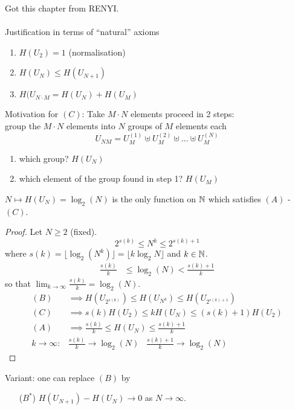 \documentclass[mfit.tex]{subfiles}
\begin{document}
Got this chapter from RENYI.\\
\\
Justification in terms of \enquote{natural} axioms
\begin{enumerate}[label=(\Alph*)]
  \item $H(U_2) = 1$ (normalisation)
  \item $H(U_N) \leq H(U_{N+1})$
  \item $H(U_{N\cdot M} = H(U_N) + H(U_M) $
\end{enumerate}

Motivation for $(C)$: Take $M \cdot N$ elements proceed in 2 steps:\\
group the $M \cdot N$ elements into $N$ groups of $M$ elements each
\[ U_{NM} = U_M^{(1)} \uplus U_M^{(2)} \uplus \dots \uplus U_M^{(N)} \]
\begin{enumerate}
  \item which group? $H(U_N)$
  \item which element of the group found in step 1? $H(U_M)$
\end{enumerate}

\begin{lemma}
  $N \mapsto H(U_N) = \log_2(N)$ is the only function on $\mathbb{N}$ which satisfies $(A)$ - $(C)$.
\end{lemma}

\begin{proof}
  Let $N \geq 2$ (fixed).
  \[ 2^{s(k)} \leq N^k \leq 2^{s(k) +1} \]
  where $s(k) =  \lfloor \log_2 (N^k) \rfloor = \lfloor k \log_2 N \rfloor$ and $k \in \mathbb{N}$.
  \begin{align*}
    \frac{s(k)}{k} &\leq \log_2 (N) < \frac{s(k)+1}{k}
  \end{align*}
  so that $\lim_{k\to \infty} \frac{s(k)}{k} = \log_2 (N)$.
  \begin{align*}
    (B) &\implies H(U_{2^{s(k)}}) \leq H(U_{N^k}) \leq H(U_{2^{s(k)+1}}) \\
    (C) &\implies s(k) H(U_2) \leq k H(U_N) \leq (s(k)+1)H(U_2) \\
    (A) &\implies \frac{s(k)}{k} \leq H(U_N) \leq \frac{s(k)+1}{k}\\
    k \to \infty: & \frac{s(k)}{k} \to \log_2(N) \;\;\; \frac{s(k)+1}{k} \to \log_2(N)
  \end{align*}
\end{proof}

Variant: one can replace $(B)$ by 
\begin{enumerate}
  \item[($B^\ast$)] $H(U_{N+1}) - H(U_N) \to 0$ as $N \to \infty$.
\end{enumerate}
\end{document}
